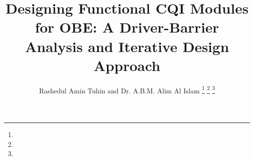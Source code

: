 \documentclass[journal,onecolumn]{IEEEtran}
\begin{document}
%
\title{Designing Functional CQI Modules for OBE: A Driver-Barrier Analysis and Iterative Design Approach}
%
%
%

\author{Rashedul Amin Tuhin  and Dr. A.B.M. Alim Al Islam%
\thanks{}%
\thanks{}%
\thanks{}}

% 
%



\markboth{}%
{}
% 
\end{document}
